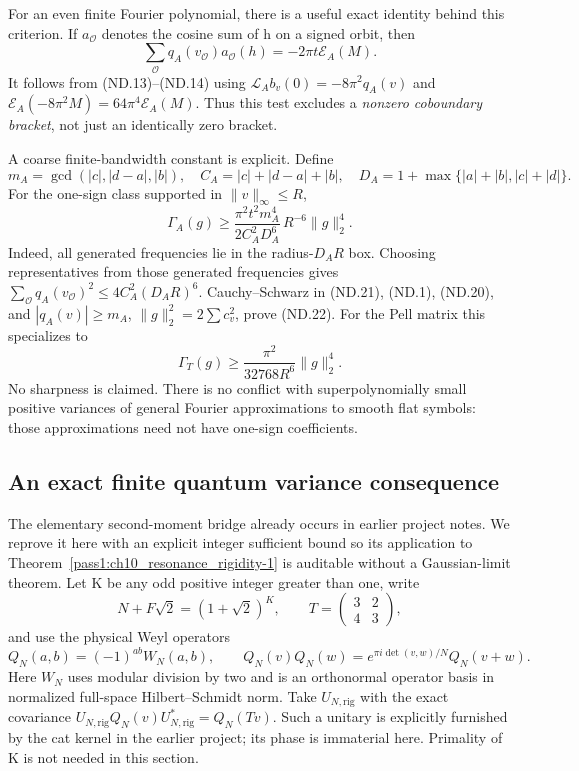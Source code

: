 For an even finite Fourier polynomial, there is a useful exact identity behind this criterion. If \(a_{\mathcal O}\) denotes the cosine sum of h on a signed orbit, then \[
 \boxed{\sum_{\mathcal O}q_A(v_{\mathcal O})a_{\mathcal O}(h)
                         =-2\pi t\mathcal E_A(M).}          \tag{ND.21}
\] It follows from (ND.13)--(ND.14) using \(\mathcal L_A b_v(0)=-8\pi^2q_A(v)\) and \(\mathcal E_A(-8\pi^2M)=64\pi^4\mathcal E_A(M)\). Thus this test excludes a \emph{nonzero coboundary bracket}, not just an identically zero bracket.

A coarse finite-bandwidth constant is explicit. Define \[
 m_A=\gcd(|c|,|d-a|,|b|),\quad C_A=|c|+|d-a|+|b|,\quad
 D_A=1+\max\{|a|+|b|,|c|+|d|\}.
\] For the one-sign class supported in \(\|v\|_\infty\leq R\), \[
 \boxed{\displaystyle
 \Gamma_A(g)\geq
 \frac{\pi^2t^2m_A^4}{2C_A^2D_A^6}\,R^{-6}\|g\|_2^4.}      \tag{ND.22}
\] Indeed, all generated frequencies lie in the radius-\(D_AR\) box. Choosing representatives from those generated frequencies gives \(\sum_{\mathcal O}q_A(v_{\mathcal O})^2\leq4C_A^2(D_AR)^6\). Cauchy--Schwarz in (ND.21), (ND.1), (ND.20), and \(|q_A(v)|\geq m_A\), \(\|g\|_2^2=2\sum c_v^2\), prove (ND.22). For the Pell matrix this specializes to \[
                \Gamma_T(g)\geq\frac{\pi^2}{32768R^6}\|g\|_2^4.
 \tag{ND.23}
\] No sharpness is claimed. There is no conflict with superpolynomially small positive variances of general Fourier approximations to smooth flat symbols: those approximations need not have one-sign coefficients.

\subsection{An exact finite quantum variance consequence}\label{nondegeneracy:an-exact-finite-quantum-variance-consequence}

The elementary second-moment bridge already occurs in earlier project notes. We reprove it here with an explicit integer sufficient bound so its application to Theorem~\ref{pass1:ch10_resonance_rigidity-1} is auditable without a Gaussian-limit theorem. Let K be any odd positive integer greater than one, write \[
 N+F\sqrt2=(1+\sqrt2)^K,
 \qquad T=\begin{pmatrix}3&2\\4&3\end{pmatrix},
\] and use the physical Weyl operators \[
 Q_N(a,b)=(-1)^{ab}W_N(a,b),\qquad
 Q_N(v)Q_N(w)=e^{\pi i\det(v,w)/N}Q_N(v+w).
\] Here \(W_N\) uses modular division by two and is an orthonormal operator basis in normalized full-space Hilbert--Schmidt norm. Take \(U_{N,\mathrm{rig}}\) with the exact covariance \(U_{N,\mathrm{rig}}Q_N(v)U_{N,\mathrm{rig}}^*=Q_N(Tv)\). Such a unitary is explicitly furnished by the cat kernel in the earlier project; its phase is immaterial here. Primality of K is not needed in this section.

